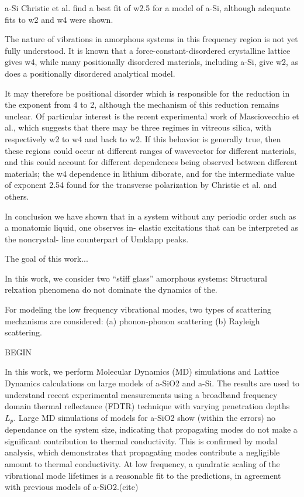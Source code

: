 \documentclass[aps,prb,twocolumn,superscriptaddress,footinbib,amsmath,amssymb,floatfix]{revtex4}
\begin{document}
a-Si
Christie et al. find a best fit of w2.5 for a model of a-Si, although 
adequate fits to w2 and w4 were shown.\cite{christie_vibrational_2007} 

The nature of vibrations in amorphous systems in this
frequency region is not yet fully understood. It is known
that a force-constant-disordered crystalline lattice gives 
w4,\cite{schirmacher_harmonic_1998,taraskin_origin_2001} 
while many positionally disordered materials, including a-Si, 
give w2, as does a positionally disordered analytical model.
\cite{martin-mayor_dynamical_2001,ciliberti_brillouin_2003} 

It may therefore be positional disorder which is responsible 
for the reduction
in the exponent from 4 to 2, although the mechanism of
this reduction remains unclear. Of particular interest is
the recent experimental work of Masciovecchio et al.,
\cite{masciovecchio_evidence_2006}
which suggests that there may be three regimes in vitreous
silica, with respectively w2 to w4 and back to w2. If this
behavior is generally true, then these regions could occur
at different ranges of wavevector for different materials,
and this could account for different dependences being
observed between different materials; the w4 dependence in 
lithium diborate,\cite{ruffle_observation_2003} and for 
the intermediate value
of exponent 2.54 found for the transverse polarization
by Christie et al.\cite{christie_vibrational_2007} and others.

In conclusion we have shown that in a system without any
periodic order such as a monatomic liquid, one observes in-
elastic excitations that can be interpreted as the noncrystal-
line counterpart of Umklapp peaks.\cite{scopigno_observation_2001} 


The goal of this work...

In this work, we consider two ``stiff glass'' amorphous systems:
Structural relxation phenomena do not dominate the dynamics 
of the.\cite{gotze_evolution_2000} 

For modeling the low frequency vibrational modes, two types of 
scattering mechanisms are considered: (a) phonon-phonon 
scattering (b) Rayleigh scattering.

BEGIN

In this work, we perform Molecular Dynamics (MD) simulations and 
Lattice Dynamics calculations on  
large models of a-SiO2 and a-Si. The results are used to 
understand recent experimental measurements using a broadband 
frequency domain thermal reflectance (FDTR) technique with varying 
penetration depths $L_p$.\cite{regner_broadband_2013}
Large MD 
simulations of models for a-SiO2 show (within the errors) no 
dependance on the system size, indicating that propagating modes 
do not make a significant contribution to thermal conductivity. 
This is confirmed by modal analysis, which demonstrates that 
propagating modes contribute a negligible amount to thermal 
conductivity. At low frequency, a quadratic scaling of the 
vibrational mode lifetimes is a reasonable fit to the predictions, 
in agreement with previous models of a-SiO2.(cite)
\end{document}
